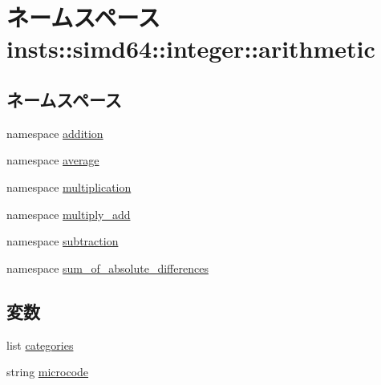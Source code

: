 \hypertarget{namespaceinsts_1_1simd64_1_1integer_1_1arithmetic}{
\section{ネームスペース insts::simd64::integer::arithmetic}
\label{namespaceinsts_1_1simd64_1_1integer_1_1arithmetic}
}
\subsection*{ネームスペース}
\begin{DoxyCompactItemize}
\item 
namespace \hyperlink{namespaceinsts_1_1simd64_1_1integer_1_1arithmetic_1_1addition}{addition}
\item 
namespace \hyperlink{namespaceinsts_1_1simd64_1_1integer_1_1arithmetic_1_1average}{average}
\item 
namespace \hyperlink{namespaceinsts_1_1simd64_1_1integer_1_1arithmetic_1_1multiplication}{multiplication}
\item 
namespace \hyperlink{namespaceinsts_1_1simd64_1_1integer_1_1arithmetic_1_1multiply__add}{multiply\_\-add}
\item 
namespace \hyperlink{namespaceinsts_1_1simd64_1_1integer_1_1arithmetic_1_1subtraction}{subtraction}
\item 
namespace \hyperlink{namespaceinsts_1_1simd64_1_1integer_1_1arithmetic_1_1sum__of__absolute__differences}{sum\_\-of\_\-absolute\_\-differences}
\end{DoxyCompactItemize}
\subsection*{変数}
\begin{DoxyCompactItemize}
\item 
list \hyperlink{namespaceinsts_1_1simd64_1_1integer_1_1arithmetic_a273cf0f1630af14c1582f05e53354a55}{categories}
\item 
string \hyperlink{namespaceinsts_1_1simd64_1_1integer_1_1arithmetic_a770f11a173e99389a8802f0107ed8f52}{microcode}
\end{DoxyCompactItemize}


